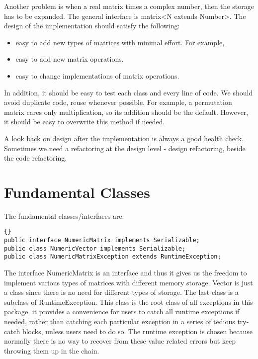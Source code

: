 Another problem is when a real matrix times a complex number, then the storage has to be expanded. The general interface is matrix<N extends Number>.
The design of the implementation should satisfy the following:
\begin{itemize}
\item easy to add new types of matrices with minimal effort. For example, 
\item easy to add new matrix operations.
\item easy to change implementations of matrix operations.
\end{itemize}
In addition, it should be easy to test each class and every line of code. We should avoid duplicate code, reuse whenever possible. For example, a permutation matrix cares only multiplication, so its addition should be the default. However, it should be easy to overwrite this method if needed.

A look back on design after the implementation is always a good health check. Sometimes we need a refactoring at the design level - design refactoring, beside the code refactoring.


\section{Fundamental Classes}
The fundamental classes/interfaces are:



\lstset{%
	basicstyle=\small, %
	commentstyle=\textit,
	stringstyle=\ttfamily, %
	showstringspaces=false,
	numbers=left, %
	numberstyle=\tiny, %
	stepnumber=1, %
	numbersep=5pt, %
	xleftmargin=5ex,%
	language=Java }
\begin{lstlisting}[frame=trbl]{}
public interface NumericMatrix implements Serializable;
public class NumericVector implements Serializable;
public class NumericMatrixException extends RuntimeException;
\end{lstlisting}
The interface NumericMatrix is an interface and thus it gives us the freedom to implement various types of matrices with different memory storage. Vector is just a class since there is no need for different types of storage. The last class is a subclass of RuntimeException. This class is the root class of all exceptions in this package, it provides a convenience for users to catch all runtime exceptions if needed, rather than catching each particular exception in a series of tedious try-catch blocks, unless users need to do so. The runtime exception is chosen because normally there is no way to recover from these value related errors but keep throwing them up in the chain.
 
